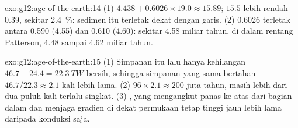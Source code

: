 \begin{solution}{exo:g12:age-of-the-earth:14}
(1) $4.438 + 0.6026 \times 19.0 \approx 15.89$; $15.5$ lebih rendah $0.39$,
sekitar \qty{2.4}{\percent}: sedimen itu terletak dekat dengan garis. (2) 0.6026
terletak antara 0.590 (4.55) dan 0.610 (4.60): sekitar 4.58 miliar tahun, di
dalam rentang Patterson, 4.48 sampai 4.62 miliar tahun.
\end{solution}

\begin{solution}{exo:g12:age-of-the-earth:15}
(1) Simpanan itu lalu hanya kehilangan $46.7 - 24.4 = \qty{22.3}{TW}$ bersih,
sehingga simpanan yang sama bertahan $46.7/22.3 \approx 2.1$ kali lebih lama.
(2) $96 \times 2.1 \approx
200$ juta tahun, masih lebih dari dua puluh kali terlalu singkat. (3) , yang mengangkut panas ke atas dari bagian dalam dan menjaga gradien di
dekat permukaan tetap tinggi jauh lebih lama daripada konduksi saja.
\end{solution}

